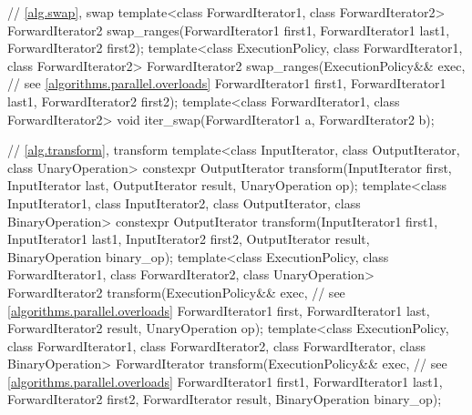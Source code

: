 \begin{codeblock}
{  // \ref{alg.swap}, swap
  template<class ForwardIterator1, class ForwardIterator2>
    ForwardIterator2 swap_ranges(ForwardIterator1 first1, ForwardIterator1 last1,
                                 ForwardIterator2 first2);
  template<class ExecutionPolicy, class ForwardIterator1, class ForwardIterator2>
    ForwardIterator2 swap_ranges(ExecutionPolicy&& exec, // see \ref{algorithms.parallel.overloads}
                                 ForwardIterator1 first1, ForwardIterator1 last1,
                                 ForwardIterator2 first2);
  template<class ForwardIterator1, class ForwardIterator2>
    void iter_swap(ForwardIterator1 a, ForwardIterator2 b);

  // \ref{alg.transform}, transform
  template<class InputIterator, class OutputIterator, class UnaryOperation>
    constexpr OutputIterator
      transform(InputIterator first, InputIterator last,
                OutputIterator result, UnaryOperation op);
  template<class InputIterator1, class InputIterator2, class OutputIterator,
           class BinaryOperation>
    constexpr OutputIterator
      transform(InputIterator1 first1, InputIterator1 last1,
                InputIterator2 first2, OutputIterator result,
                BinaryOperation binary_op);
  template<class ExecutionPolicy, class ForwardIterator1, class ForwardIterator2,
           class UnaryOperation>
    ForwardIterator2
      transform(ExecutionPolicy&& exec, // see \ref{algorithms.parallel.overloads}
                ForwardIterator1 first, ForwardIterator1 last,
                ForwardIterator2 result, UnaryOperation op);
  template<class ExecutionPolicy, class ForwardIterator1, class ForwardIterator2,
           class ForwardIterator, class BinaryOperation>
    ForwardIterator
      transform(ExecutionPolicy&& exec, // see \ref{algorithms.parallel.overloads}
                ForwardIterator1 first1, ForwardIterator1 last1,
                ForwardIterator2 first2, ForwardIterator result,
                BinaryOperation binary_op);

}
\end{codeblock}
